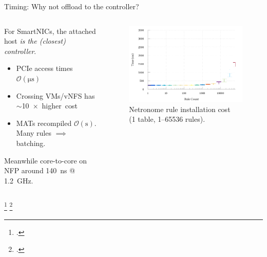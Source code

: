 \documentclass[aspectratio=169,xcolor={dvipsnames}
,handout
]{beamer}
\begin{document}
\begin{frame}{Timing: Why not offload to the controller?}
	\begin{columns}
		\begin{column}{0.5\linewidth}
			For SmartNICs, the attached host \emph{is the (closest) controller}.
			
			\begin{itemize}
				\item PCIe access times $\mathcal{O}(\si{\micro\second})$\footnotemark
				\item Crossing VMs/vNFS has $\sim$\SI{10}{$\times$} higher cost\footnotemark
				\item MATs recompiled $\mathcal{O}(\si{\second})$. Many rules $\implies$ batching.
			\end{itemize}
			
			
			\alert{Meanwhile core-to-core on NFP around \SI{140}{\nano\second} @ \SI{1.2}{\giga\hertz}.}
		\end{column}
		\begin{column}{0.5\linewidth}
			\begin{figure}
				\includegraphics[width=0.9\linewidth]{../plots/build/rte-timer/rte-times-logx}
				\caption{Netronome rule installation cost \\(1 table, \numrange{1}{65536} rules).}
			\end{figure}
		\end{column}
	\end{columns}
	\setcounter{footnote}{3}
	\footcitetext{DBLP:conf/sigcomm/NeugebauerAZAL018}
	\setcounter{footnote}{4}
	\footcitetext{DBLP:journals/cm/CzivaP17}
\end{frame}
\end{document}
